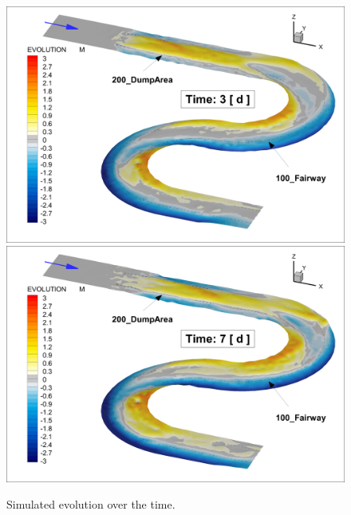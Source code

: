 \begin{figure} [!h]
\centering
\includegraphics[scale=0.14]{img/critDig_Poly_03p0d.png}
\includegraphics[scale=0.14]{img/critDig_Poly_07p0d.png}
\caption{Simulated evolution over the time.}\label{result34}
\end{figure}

